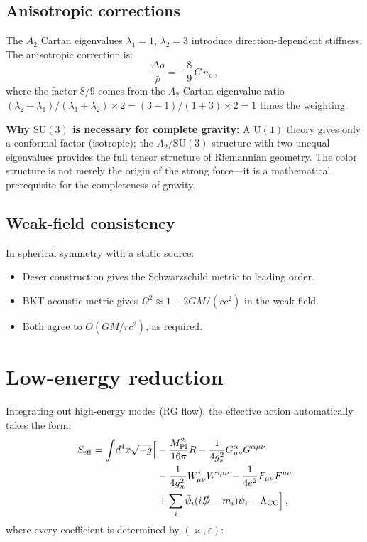 \documentclass[twocolumn,preprintnumbers,amsmath,amssymb,prd]{revtex4-2}
\begin{document}
\subsection{Anisotropic corrections}

The $A_2$ Cartan eigenvalues $\lambda_1 = 1$, $\lambda_2 = 3$ introduce direction-dependent stiffness.
The anisotropic correction is:
\begin{equation}
\frac{\Delta\rho}{\bar{\rho}} = -\frac{8}{9}\,C\,n_v\,,
\end{equation}
where the factor $8/9$ comes from the $A_2$ Cartan eigenvalue ratio $(\lambda_2 - \lambda_1)/(\lambda_1 + \lambda_2) \times 2 = (3-1)/(1+3)\times 2 = 1$ times the weighting.

\textbf{Why $\mathrm{SU}(3)$ is necessary for complete gravity:} A $\mathrm{U}(1)$ theory gives only a conformal factor (isotropic); the $A_2/\mathrm{SU}(3)$ structure with two unequal eigenvalues provides the full tensor structure of Riemannian geometry.
The color structure is not merely the origin of the strong force---it is a mathematical prerequisite for the completeness of gravity.

\subsection{Weak-field consistency}

In spherical symmetry with a static source:
\begin{itemize}
\item Deser construction gives the Schwarzschild metric to leading order.
\item BKT acoustic metric gives $\Omega^2 \approx 1 + 2GM/(rc^2)$ in the weak field.
\item Both agree to $O(GM/rc^2)$, as required.
\end{itemize}

\section{Low-energy reduction}
\label{sec:lowenergy}

Integrating out high-energy modes (RG flow), the effective action automatically takes the form:
\begin{align}
S_{\rm eff} = \int\! d^4x\sqrt{-g}\Bigl[
&-\frac{M_{\rm Pl}^2}{16\pi}R
- \frac{1}{4g_s^2}G^\alpha_{\mu\nu}G^{\alpha\mu\nu} \notag\\
&- \frac{1}{4g_w^2}W^i_{\mu\nu}W^{i\mu\nu}
- \frac{1}{4e^2}F_{\mu\nu}F^{\mu\nu} \notag\\
&+ \sum_i\bar{\psi}_i(i\slashed{D} - m_i)\psi_i
- \Lambda_{\rm CC}\Bigr]\,,
\label{eq:SM_GR}
\end{align}
where every coefficient is determined by $(\varkappa, \varepsilon)$:
\end{document}
